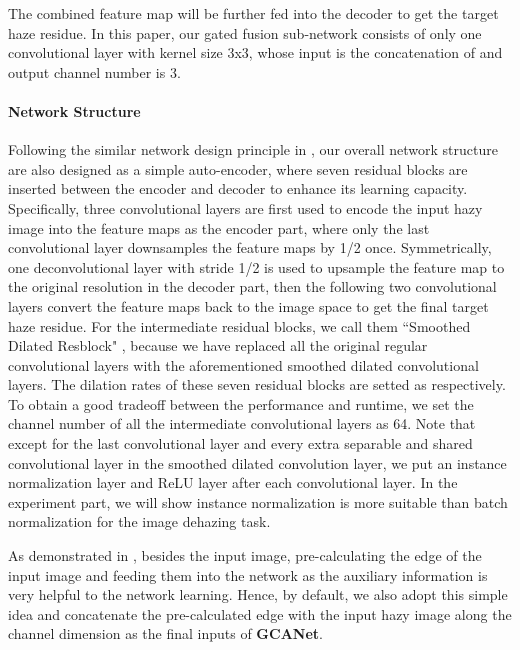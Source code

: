 \documentclass[10pt,twocolumn,letterpaper]{article}
\begin{document}
The combined feature map  will be further fed into the decoder to get the target haze residue. In this paper, our gated fusion sub-network consists of only one convolutional layer with kernel size 3x3, whose input is the concatenation of  and output channel number is 3.

\paragraph{Network Structure}Following the similar network design principle in \cite{johnson2016perceptual,fan2017generic,fan2018decouple}, our overall network structure are also designed as a simple auto-encoder, where seven residual blocks are inserted between the encoder and decoder to enhance its learning capacity. Specifically, three convolutional layers are first used to encode the input hazy image into the feature maps as the encoder part, where only the last convolutional layer downsamples the feature maps by 1/2 once. Symmetrically, one deconvolutional layer with stride 1/2 is used to upsample the feature map to the original resolution in the decoder part, then the following two convolutional layers convert the feature maps back to the image space to get the final target haze residue. For the intermediate residual blocks, we call them ``Smoothed Dilated Resblock" , because we have replaced all the original regular convolutional layers with the aforementioned smoothed dilated convolutional layers. The dilation rates of these seven residual blocks are setted as   respectively. To obtain a good tradeoff between the performance and runtime, we set the channel number of all the intermediate convolutional layers as 64. Note that except for the last convolutional layer and every extra separable and shared convolutional layer in the smoothed dilated convolution layer, we put an instance normalization layer \cite{ulyanovinstance} and ReLU layer after each convolutional layer. In the experiment part, we will show instance normalization is more suitable than batch normalization for the image dehazing task.

As demonstrated in \cite{fan2017generic,fan2018decouple}, besides the input image, pre-calculating the edge of the input image and feeding them into the network as the auxiliary information is  very helpful to the network learning. Hence, by default, we also adopt this simple idea and concatenate the pre-calculated edge with the input hazy image along the channel dimension as the final inputs of \textbf{GCANet}.
\end{document}
